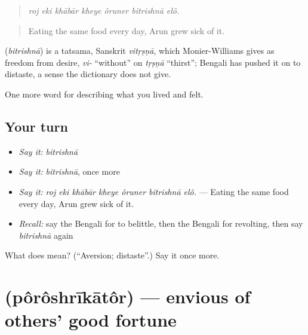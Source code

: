\begin{quote}
\emph{roj eki khābār kheye ôruner bitrishnā elô.}
\end{quote}

\begin{quote}
Eating the same food every day, Arun grew sick of it.
\end{quote}

\begin{cousinweb}
\textbf{} (\emph{bitrishnā}) is a tatsama, Sanskrit \emph{vitṛṣṇā}, which Monier-Williams gives as freedom from desire, \emph{vi-} \textquotedblleft{}without\textquotedblright{} on \emph{tṛṣṇā} \textquotedblleft{}thirst\textquotedblright{}; Bengali has pushed it on to distaste, a sense the dictionary does not give.
\end{cousinweb}

\begin{grammarlens}[title={What you've built}]
One more word for describing what you lived and felt.
\end{grammarlens}

\subsection*{Your turn}
\begin{itemize}
\raggedright
  \item \emph{Say it:} \emph{bitrishnā}
  \item \emph{Say it:} \emph{bitrishnā}, once more
  \item \emph{Say it:} \emph{roj eki khābār kheye ôruner bitrishnā elô.} — Eating the same food every day, Arun grew sick of it.
  \item \emph{Recall:} say the Bengali for to belittle, then the Bengali for revolting, then say \emph{bitrishnā} again
\end{itemize}

\begin{tcolorbox}[breakable,colback=teal!4,colframe=teal!35!black,title={Before you move on}]
What does  mean? (\textquotedblleft{}Aversion; distaste\textquotedblright{}.) Say it once more.
\end{tcolorbox}
\section[\texorpdfstring{\bn{পরশ্রীকাতর} (pôrôshrīkātôr)}{পরশ্রীকাতর (pôrôshrīkātôr)}]{ (pôrôshrīkātôr) — envious of others' good fortune}

